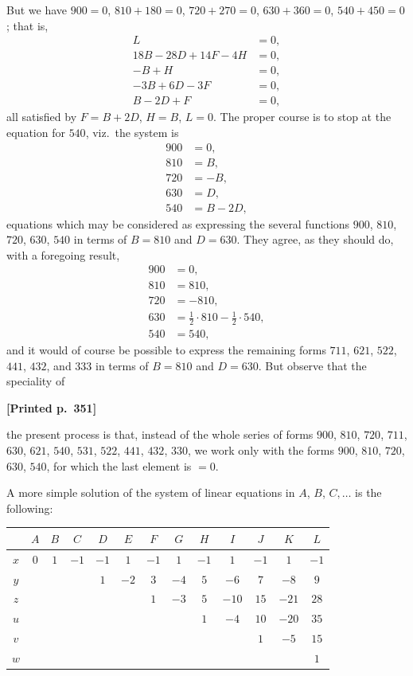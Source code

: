 \documentclass[11pt]{article}
\begin{document}
But we have $900 = 0$, $810 + 180 = 0$, $720 + 270 = 0$, $630 + 360 = 0$, $540 + 450 = 0$; that is,
\begin{align*}
L &= 0, \\
18B - 28D + 14F - 4H &= 0, \\
-B + H &= 0, \\
-3B + 6D - 3F &= 0, \\
B - 2D + F &= 0,
\end{align*}
all satisfied by $F = B + 2D$, $H = B$, $L = 0$. The proper course is to stop at the equation for $540$, viz.\ the system is
\begin{align*}
900 &= 0, \\
810 &= B, \\
720 &= -B, \\
630 &= D, \\
540 &= B - 2D,
\end{align*}
equations which may be considered as expressing the several functions $900$, $810$, $720$, $630$, $540$ in terms of $B = 810$ and $D = 630$. They agree, as they should do, with a foregoing result,
\begin{align*}
900 &= 0, \\
810 &= 810, \\
720 &= -810, \\
630 &= \tfrac{1}{2}\cdot 810 - \tfrac{1}{2}\cdot 540, \\
540 &= 540,
\end{align*}
and it would of course be possible to express the remaining forms $711$, $621$, $522$, $441$, $432$, and $333$ in terms of $B = 810$ and $D = 630$. But observe that the speciality of

\medskip

\noindent\textbf{[Printed p.~351]}\hfill

\noindent the present process is that, instead of the whole series of forms $900$, $810$, $720$, $711$, $630$, $621$, $540$, $531$, $522$, $441$, $432$, $330$, we work only with the forms $900$, $810$, $720$, $630$, $540$, for which the last element is $= 0$.

A more simple solution of the system of linear equations in $A$, $B$, $C, \dots$ is the following:

\medskip

\begin{center}
\small
\begin{tabular}{|c|cccccccccccc|}
\hline
 & $A$ & $B$ & $C$ & $D$ & $E$ & $F$ & $G$ & $H$ & $I$ & $J$ & $K$ & $L$ \\
\hline
$x$ & $0$ & $1$ & $-1$ & $-1$ & $1$ & $-1$ & $1$ & $-1$ & $1$ & $-1$ & $1$ & $-1$ \\
$y$ & & & & $1$ & $-2$ & $3$ & $-4$ & $5$ & $-6$ & $7$ & $-8$ & $9$ \\
$z$ & & & & & & $1$ & $-3$ & $5$ & $-10$ & $15$ & $-21$ & $28$ \\
$u$ & & & & & & & & $1$ & $-4$ & $10$ & $-20$ & $35$ \\
$v$ & & & & & & & & & & $1$ & $-5$ & $15$ \\
$w$ & & & & & & & & & & & & $1$ \\
\hline
\end{tabular}
\end{center}
\end{document}
